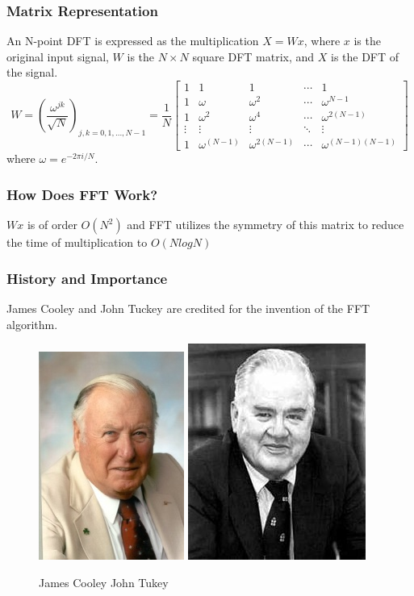 \documentclass{beamer}
\begin{document}

\begin{frame}
\frametitle{Matrix Representation}
An N-point DFT is expressed as the multiplication $X = Wx$, where $x$ is the original input signal, $W$ is the $N\times N$ square DFT matrix, and $X$ is the DFT of the signal.
$$W = (\frac{\omega^{jk}}{\sqrt{N}})_{j,k = 0,1,\ldots,N-1}=\frac{1}{N}
\begin{bmatrix}
1 & 1 & 1 & \cdots & 1\\
1 & \omega & \omega^2 & \cdots & \omega^{N-1}\\
1 & \omega^2 & \omega^4  & \cdots & \omega^{2(N-1)}\\
\vdots & \vdots & \vdots & \ddots & \vdots \\
1 & \omega^{(N-1)} & \omega^{2(N-1)} & \cdots & \omega^{(N-1)(N-1)}
\end{bmatrix}
$$
where $\omega = e^{-2\pi i/N}$.
\end{frame}


\begin{frame}
\frametitle{How Does FFT Work?}
$Wx$ is of order $O(N^2)$ and FFT utilizes the symmetry of this matrix to reduce the time of multiplication to $O(NlogN)$
\end{frame}


\begin{frame}
\frametitle{History and Importance}
James Cooley and John Tuckey are credited for the invention of the FFT algorithm.
\begin{figure}
\includegraphics[width=0.22\linewidth]{cooley.jpg}\hspace{2cm}
\includegraphics[width=0.25\linewidth]{tukey.jpg}
\caption{\scriptsize{James Cooley \hspace{3.5cm}  John Tukey}}
\end{figure}
\end{frame}
\end{document}
